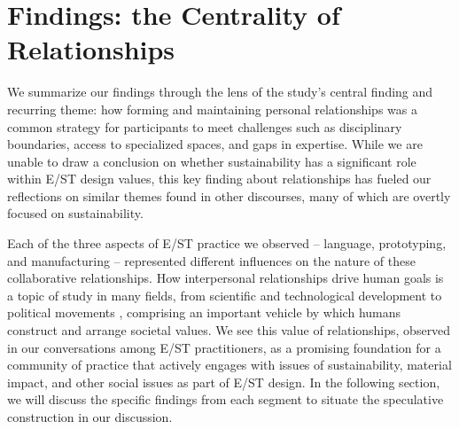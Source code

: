 \documentclass[manuscript,review,anonymous]{acmart}
\begin{document}

\section{Findings: the Centrality of Relationships}

We summarize our findings through the lens of the study's central finding and recurring theme:
how forming and maintaining personal relationships was a common strategy for participants to meet challenges such as disciplinary boundaries, access to specialized spaces, and gaps in expertise. While we are unable to draw a conclusion on whether sustainability has a significant role within E/ST design values, this key finding about relationships has fueled our reflections on similar themes found in other discourses, many of which are overtly focused on sustainability. 

Each of the three aspects of E/ST practice we observed -- language, prototyping, and manufacturing -- represented different influences on the nature of these collaborative relationships. How interpersonal relationships drive human goals is a topic of study in many fields, from scientific and technological development \cite{rifat_breaking_2019, steinhardt_breaking_2016, maudet_design_2017, zhang_designing_2019} 
to political movements \cite{hobart_radical_2020, sze_environmental_2020, mcalevey_no_2016}, comprising an important vehicle by which humans construct and arrange societal values. 
We see this value of relationships, observed in our conversations among E/ST practitioners, as a promising foundation for a community of practice that actively engages with issues of sustainability, material impact, and other social issues as part of E/ST design. In the following section, we will discuss the specific findings from each segment to situate the speculative construction in our discussion. 

\end{document}
